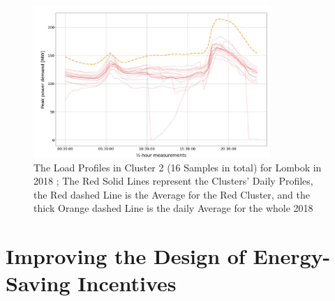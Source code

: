 \begin{figure}
    \centering
    \includegraphics[width=0.8\textwidth]{figures/jessen_ndImpactedClusters/jessen_ClusterTwo2018.png}
    \caption{The Load Profiles in Cluster 2 (16 Samples in total) for Lombok in 2018 \cite{JES-IND};
    The Red Solid Lines represent the Clusters' Daily Profiles, the Red dashed Line is the Average for the Red Cluster, and the thick Orange dashed Line is the daily Average for the whole 2018}
    \label{fig:clustering_results_2018_cluster_two}
\end{figure}

\section{Improving the Design of Energy-Saving Incentives}
\label{sec:improving_the_design_of_energy_saving_incentives}



